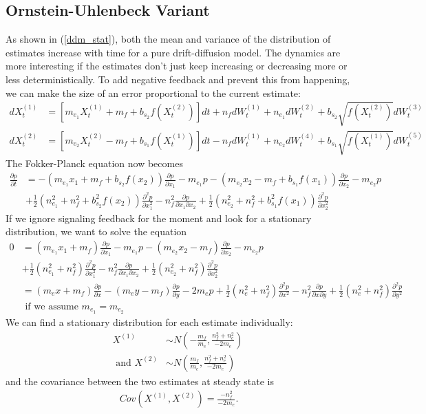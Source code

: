 \documentclass{article}
\begin{document}
\subsection{Ornstein-Uhlenbeck Variant }
As shown in (\ref{ddm_stat}), both the mean and variance of the distribution of estimates increase with time for a pure drift-diffusion model.  The dynamics are more interesting if the estimates don't just keep increasing or decreasing more or less deterministically.  To add negative feedback and prevent this from happening, we can make the size of an error proportional to the current estimate:
\begin{align*}
dX_t^{(1)}&=\left[m_{e_1}X_t^{(1)}+m_f+b_{s_2}f(X_t^{(2)})\right]dt+n_fdW_t^{(1)}+n_{e_1}dW_t^{(2)}+b_{s_2}\sqrt{f(X_t^{(2)})}dW_t^{(3)}
\\ dX_t^{(2)}&=\left[m_{e_2}X_t^{(2)}-m_f+b_{s_1}f(X_t^{(1)})\right]dt-n_fdW_t^{(1)}+n_{e_2}dW_t^{(4)}+b_{s_1}\sqrt{f(X_t^{(1)})}dW_t^{(5)}
\end{align*}
The Fokker-Planck equation now becomes
\begin{align*}
 \frac{\partial p}{\partial t}&=-(m_{e_1}x_1+m_f+b_{s_2}f(x_2))\frac{\partial p}{\partial x_1}-m_{e_1}p-(m_{e_2}x_2-m_f+b_{s_1}f(x_1))\frac{\partial p}{\partial x_2}-m_{e_2}p
\\&+\frac{1}{2}(n_{e_1}^2+n_f^2+b_{s_2}^2f(x_2))\frac{\partial^2 p}{\partial x_1^2}-n_f^2\frac{\partial p}{\partial x_1\partial x_2}+\frac{1}{2}(n_{e_2}^2+n_f^2+b_{s_1}^2f(x_1))\frac{\partial^2 p}{\partial x_2^2}
\end{align*}
If we ignore signaling feedback for the moment and look for a stationary distribution, we want to solve the equation
\begin{align*}
0&=(m_{e_1}x_1+m_f)\frac{\partial p}{\partial x_1}-m_{e_1}p-(m_{e_2}x_2-m_f)\frac{\partial p}{\partial x_2}-m_{e_2}p
\\&+\frac{1}{2}(n_{e_1}^2+n_f^2)\frac{\partial^2 p}{\partial x_1^2}-n_f^2\frac{\partial p}{\partial x_1\partial x_2}+\frac{1}{2}(n_{e_2}^2+n_f^2)\frac{\partial^2 p}{\partial x_2^2}
\\&=(m_ex+m_f)\frac{\partial p}{\partial x}-(m_ey-m_f)\frac{\partial p}{\partial y}-2m_ep+\frac{1}{2}(n_e^2+n_f^2)\frac{\partial^2 p}{\partial x^2}-n_f^2\frac{\partial p}{\partial x\partial y}+\frac{1}{2}(n_e^2+n_f^2)\frac{\partial^2 p}{\partial y^2}
\\& \text{ if we assume $m_{e_1}=m_{e_2}$}
\end{align*}
We can find a stationary distribution for each estimate individually:
\begin{align}
X^{(1)}& \sim N\left(-\frac{m_f}{m_e},\frac{n_f^2+n_e^2}{-2m_e}\right)\ \label{ou_stat1}
\\ \text{ and } X^{(2)} &\sim N\left(\frac{m_f}{m_e},\frac{n_f^2+n_e^2}{-2m_e}\right) \label{ou_stat2}
\end{align}
and the covariance between the two estimates at steady state is
\begin{align*}
Cov(X^{(1)},X^{(2)})=\frac{-n_f^2}{-2m_e}.
\end{align*}
\end{document}
